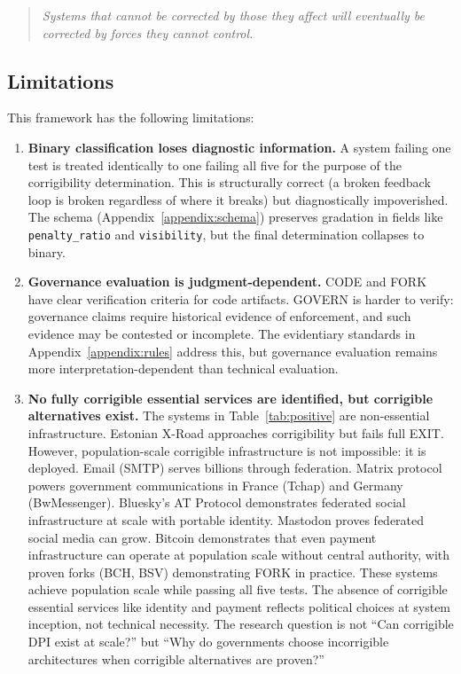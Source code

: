 \documentclass{article}
\begin{document}
\begin{quote}
\textit{Systems that cannot be corrected by those they affect will eventually be corrected by forces they cannot control.}
\end{quote}

\subsection{Limitations}

This framework has the following limitations:

\begin{enumerate}
    \item \textbf{Binary classification loses diagnostic information.} A system failing one test is treated identically to one failing all five for the purpose of the corrigibility determination. This is structurally correct (a broken feedback loop is broken regardless of where it breaks) but diagnostically impoverished. The schema (Appendix~\ref{appendix:schema}) preserves gradation in fields like \texttt{penalty\_ratio} and \texttt{visibility}, but the final determination collapses to binary.

    \item \textbf{Governance evaluation is judgment-dependent.} CODE and FORK have clear verification criteria for code artifacts. GOVERN is harder to verify: governance claims require historical evidence of enforcement, and such evidence may be contested or incomplete. The evidentiary standards in Appendix~\ref{appendix:rules} address this, but governance evaluation remains more interpretation-dependent than technical evaluation.

    \item \textbf{No fully corrigible essential services are identified, but corrigible alternatives exist.} The systems in Table~\ref{tab:positive} are non-essential infrastructure. Estonian X-Road approaches corrigibility but fails full EXIT. However, population-scale corrigible infrastructure is not impossible: it is deployed. Email (SMTP) serves billions through federation. Matrix protocol powers government communications in France (Tchap) and Germany (BwMessenger). Bluesky's AT Protocol demonstrates federated social infrastructure at scale with portable identity. Mastodon proves federated social media can grow. Bitcoin demonstrates that even payment infrastructure can operate at population scale without central authority, with proven forks (BCH, BSV) demonstrating FORK in practice. These systems achieve population scale while passing all five tests. The absence of corrigible essential services like identity and payment reflects political choices at system inception, not technical necessity. The research question is not ``Can corrigible DPI exist at scale?'' but ``Why do governments choose incorrigible architectures when corrigible alternatives are proven?''


\end{enumerate}
\end{document}
